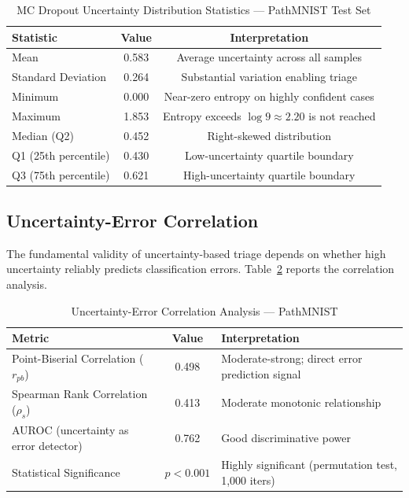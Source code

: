 \begin{table}[h]
\footnotesize
\centering
\caption{MC Dropout Uncertainty Distribution Statistics — PathMNIST Test Set}
\label{tab:ch5_unc_stats}
\begin{tabular}{lcc}
\toprule
\textbf{Statistic} & \textbf{Value} & \textbf{Interpretation} \\
\midrule
Mean                   & 0.583  & Average uncertainty across all samples \\
Standard Deviation     & 0.264  & Substantial variation enabling triage \\
Minimum                & 0.000  & Near-zero entropy on highly confident cases \\
Maximum                & 1.853  & Entropy exceeds $\log 9 \approx 2.20$ is not reached \\
Median (Q2)            & 0.452  & Right-skewed distribution \\
Q1 (25th percentile)   & 0.430  & Low-uncertainty quartile boundary \\
Q3 (75th percentile)   & 0.621  & High-uncertainty quartile boundary \\
\bottomrule
\end{tabular}
\end{table}

\subsection{Uncertainty-Error Correlation}

The fundamental validity of uncertainty-based triage depends on whether high uncertainty reliably predicts classification errors. Table~\ref{tab:ch5_unc_corr} reports the correlation analysis.

\begin{table}[h]
\footnotesize
\centering
\caption{Uncertainty-Error Correlation Analysis — PathMNIST}
\label{tab:ch5_unc_corr}
\begin{tabular}{lcl}
\toprule
\footnotesize
\textbf{Metric} & \textbf{Value} & \textbf{Interpretation} \\
\midrule
Point-Biserial Correlation ($r_{pb}$) & 0.498 & Moderate-strong; direct error prediction signal \\
Spearman Rank Correlation ($\rho_s$)  & 0.413 & Moderate monotonic relationship \\
AUROC (uncertainty as error detector) & 0.762 & Good discriminative power \\
Statistical Significance              & $p < 0.001$ & Highly significant (permutation test, 1,000 iters) \\
\bottomrule
\end{tabular}
\end{table}

